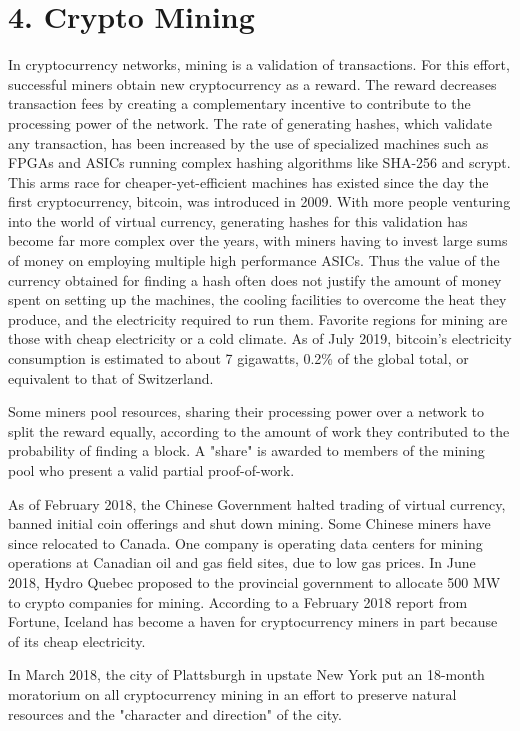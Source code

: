 \section*{4. Crypto Mining}

In cryptocurrency networks, mining is a validation of transactions. For this effort, successful miners obtain new cryptocurrency as a reward. The reward decreases transaction fees by creating a complementary incentive to contribute to the processing power of the network. The rate of generating hashes, which validate any transaction, has been increased by the use of specialized machines such as FPGAs and ASICs running complex hashing algorithms like SHA-256 and scrypt. This arms race for cheaper-yet-efficient machines has existed since the day the first cryptocurrency, bitcoin, was introduced in 2009. With more people venturing into the world of virtual currency, generating hashes for this validation has become far more complex over the years, with miners having to invest large sums of money on employing multiple high performance ASICs. Thus the value of the currency obtained for finding a hash often does not justify the amount of money spent on setting up the machines, the cooling facilities to overcome the heat they produce, and the electricity required to run them. Favorite regions for mining are those with cheap electricity or a cold climate. As of July 2019, bitcoin's electricity consumption is estimated to about 7 gigawatts, 0.2\% of the global total, or equivalent to that of Switzerland.

Some miners pool resources, sharing their processing power over a network to split the reward equally, according to the amount of work they contributed to the probability of finding a block. A "share" is awarded to members of the mining pool who present a valid partial proof-of-work.

As of February 2018, the Chinese Government halted trading of virtual currency, banned initial coin offerings and shut down mining. Some Chinese miners have since relocated to Canada. One company is operating data centers for mining operations at Canadian oil and gas field sites, due to low gas prices. In June 2018, Hydro Quebec proposed to the provincial government to allocate 500 MW to crypto companies for mining. According to a February 2018 report from Fortune, Iceland has become a haven for cryptocurrency miners in part because of its cheap electricity.

In March 2018, the city of Plattsburgh in upstate New York put an 18-month moratorium on all cryptocurrency mining in an effort to preserve natural resources and the "character and direction" of the city.

